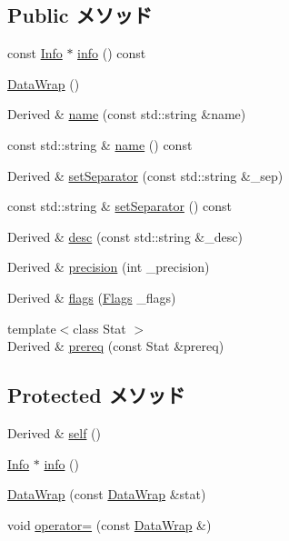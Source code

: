 \subsection*{Public メソッド}
\begin{DoxyCompactItemize}
\item 
const \hyperlink{classStats_1_1Info}{Info} $\ast$ \hyperlink{classStats_1_1DataWrap_a69ddecf05fa28115a433af3080071d37}{info} () const 
\item 
\hyperlink{classStats_1_1DataWrap_a05d1406c2c3dc59034270b4cca434867}{DataWrap} ()
\item 
Derived \& \hyperlink{classStats_1_1DataWrap_a8eaf5c2b92132dfcacd7d9b10afb1726}{name} (const std::string \&name)
\item 
const std::string \& \hyperlink{classStats_1_1DataWrap_a324e8c54c4c5161913681a1a52fef959}{name} () const 
\item 
Derived \& \hyperlink{classStats_1_1DataWrap_a3ce5f6710b42a49a8b756760b90199be}{setSeparator} (const std::string \&\_\-sep)
\item 
const std::string \& \hyperlink{classStats_1_1DataWrap_a80da350fc3ba4b48698156c88a32a842}{setSeparator} () const 
\item 
Derived \& \hyperlink{classStats_1_1DataWrap_a468ac824164327ed474749083bbb7876}{desc} (const std::string \&\_\-desc)
\item 
Derived \& \hyperlink{classStats_1_1DataWrap_a472723dc134761499ab0ced3e38d6a26}{precision} (int \_\-precision)
\item 
Derived \& \hyperlink{classStats_1_1DataWrap_a44a5f223105dda0be0ebda809eef5d3d}{flags} (\hyperlink{classFlags}{Flags} \_\-flags)
\item 
{\footnotesize template$<$class Stat $>$ }\\Derived \& \hyperlink{classStats_1_1DataWrap_afdc2da9c7e7848993734ee52aa9a784a}{prereq} (const Stat \&prereq)
\end{DoxyCompactItemize}
\subsection*{Protected メソッド}
\begin{DoxyCompactItemize}
\item 
Derived \& \hyperlink{classStats_1_1DataWrap_a334ee8b9534d94e8db50092240feaebd}{self} ()
\item 
\hyperlink{classStats_1_1Info}{Info} $\ast$ \hyperlink{classStats_1_1DataWrap_aec129e6dc6d561f923a46dd5fa3a1908}{info} ()
\item 
\hyperlink{classStats_1_1DataWrap_a970a3b4f93d8bf65a04cc96e8de1ca66}{DataWrap} (const \hyperlink{classStats_1_1DataWrap}{DataWrap} \&stat)
\item 
void \hyperlink{classStats_1_1DataWrap_abbb367287ae111264a1f2e657b5f8f36}{operator=} (const \hyperlink{classStats_1_1DataWrap}{DataWrap} \&)
\end{DoxyCompactItemize}
